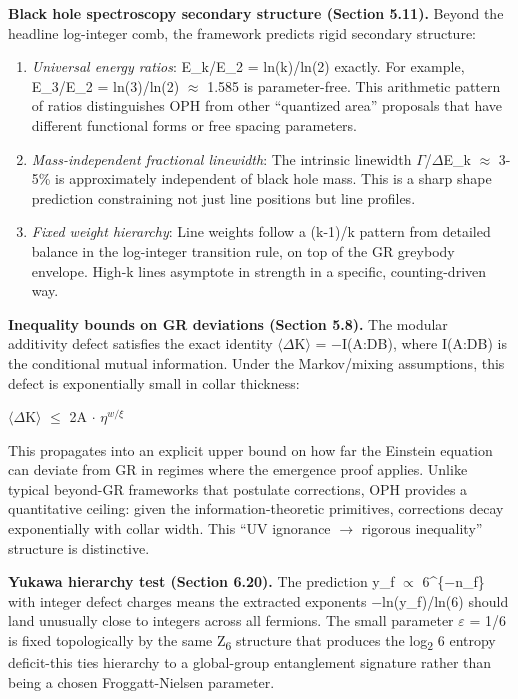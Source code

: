 \documentclass[11pt,a4paper]{article}
\theoremstyle{remark}
\begin{document}
\textbf{Black hole spectroscopy secondary structure (Section 5.11).} Beyond the headline log-integer comb, the framework predicts rigid secondary structure:

\begin{enumerate}
\def\labelenumi{\arabic{enumi}.}
\item
  \emph{Universal energy ratios}: E\_k/E\_2 = ln(k)/ln(2) exactly. For example, E\_3/E\_2 = ln(3)/ln(2) \ensuremath{\approx} 1.585 is parameter-free. This arithmetic pattern of ratios distinguishes OPH from other ``quantized area'' proposals that have different functional forms or free spacing parameters.
\item
  \emph{Mass-independent fractional linewidth}: The intrinsic linewidth \ensuremath{\Gamma}/\ensuremath{\Delta}E\_k \ensuremath{\approx} 3-5\% is approximately independent of black hole mass. This is a sharp shape prediction constraining not just line positions but line profiles.
\item
  \emph{Fixed weight hierarchy}: Line weights follow a (k-1)/k pattern from detailed balance in the log-integer transition rule, on top of the GR greybody envelope. High-k lines asymptote in strength in a specific, counting-driven way.
\end{enumerate}

\textbf{Inequality bounds on GR deviations (Section 5.8).} The modular additivity defect satisfies the exact identity \ensuremath{\langle}\ensuremath{\Delta}K\ensuremath{\rangle} = \ensuremath{-}I(A:D\textbar B), where I(A:D\textbar B) is the conditional mutual information. Under the Markov/mixing assumptions, this defect is exponentially small in collar thickness:

\textbar\ensuremath{\langle}\ensuremath{\Delta}K\ensuremath{\rangle}\textbar{} \ensuremath{\leq} 2\textbar A\textbar{} \ensuremath{\cdot} $\eta^{w/\ensuremath{\xi}}$

This propagates into an explicit upper bound on how far the Einstein equation can deviate from GR in regimes where the emergence proof applies. Unlike typical beyond-GR frameworks that postulate corrections, OPH provides a quantitative ceiling: given the information-theoretic primitives, corrections decay exponentially with collar width. This ``UV ignorance \ensuremath{\to} rigorous inequality'' structure is distinctive.

\textbf{Yukawa hierarchy test (Section 6.20).} The prediction y\_f \ensuremath{\propto} 6\^{}\{\ensuremath{-}n\_f\} with integer defect charges means the extracted exponents \ensuremath{-}ln(y\_f)/ln(6) should land unusually close to integers across all fermions. The small parameter \ensuremath{\varepsilon} = 1/6 is fixed topologically by the same Z\textsubscript{6} structure that produces the log\textsubscript{2} 6 entropy deficit-this ties hierarchy to a global-group entanglement signature rather than being a chosen Froggatt-Nielsen parameter.
\end{document}
